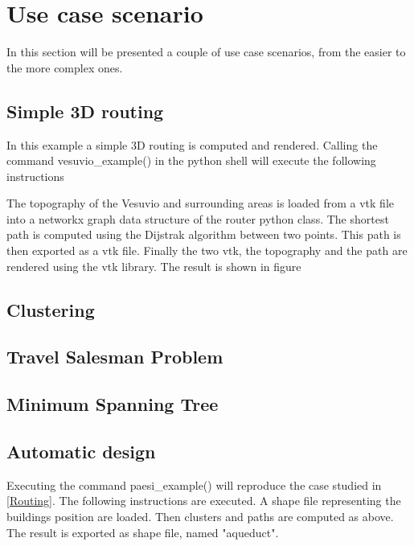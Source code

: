\chapter{Use case scenario}
\label{appendiceE}
\thispagestyle{empty}

\noindent In this section will be presented a couple of use case scenarios, from the easier to 
the more complex ones.

\section{Simple 3D routing}













In this example a simple 3D routing is computed and rendered. Calling the command vesuvio_example() 
in the python shell will execute the following instructions 


The topography of the Vesuvio and surrounding areas is loaded from a vtk file into a networkx graph 
data structure of the router python class. The shortest path is computed using the Dijstrak algorithm 
between two points. This path is then exported as a vtk file. Finally the two vtk, the topography and the path are rendered using the vtk library. The result is shown in figure 


\section{Clustering}
\section{Travel Salesman Problem}
\section{Minimum Spanning Tree}

\section{Automatic design}
Executing the command paesi_example() will reproduce the case studied in \ref{Routing}. The following 
instructions are executed. A shape file representing the buildings position  
are loaded. Then clusters and paths are computed as above. The result is exported as shape file, 
named "aqueduct".